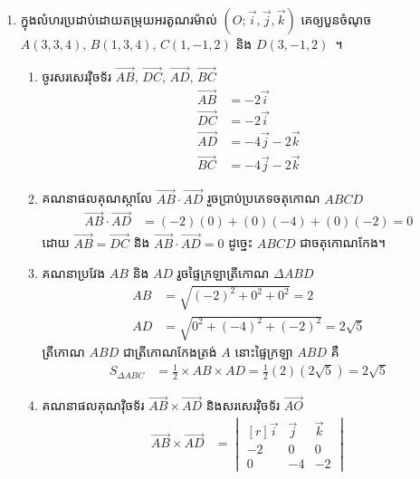 \documentclass[11pt,a4paper]{myclass}
\begin{document}
\begin{enumerate}
\begin{enumerate}
\begin{figure}[H]
\begin{tikzpicture}
				\end{tikzpicture}
			\end{figure}
		\end{enumerate}
		\item ក្នុងលំហរប្រដាប់ដោយតម្រុយអរតូណរម៉ាល់ $ (O;\vec{i},\vec{j},\vec{k}) $ គេឲ្យបួនចំណុច $ A(3,3,4),\,B(1,3,4),\,C(1,-1,2) $ និង $ D(3,-1,2) $~។%
		\begin{enumerate}
			\item ចូរសរសេរវ៉ិចទ័រ $ \overrightarrow{AB},\,\overrightarrow{DC},\,\overrightarrow{AD},\,\overrightarrow{BC} $
			\begin{align*}
			\overrightarrow{AB} &=-2\vec{i}\\
			\overrightarrow{DC} &=-2\vec{i}\\
			\overrightarrow{AD} &=-4\vec{j}-2\vec{k}\\
			\overrightarrow{BC} &=-4\vec{j}-2\vec{k}
			\end{align*}
			\item គណនាផលគុណស្កាលែ $ \overrightarrow{AB}\cdot\overrightarrow{AD} $ រួចប្រាប់ប្រភេទចតុកោណ $ ABCD $
			\begin{align*}
			\overrightarrow{AB}\cdot\overrightarrow{AD}
			&=(-2)(0)+(0)(-4)+(0)(-2)=0
			\end{align*}
			ដោយ $ \overrightarrow{AB}=\overrightarrow{DC} $ និង $ \overrightarrow{AB}\cdot\overrightarrow{AD}=0 $ ដូច្នេះ $ ABCD $ ជាចតុកោណកែង។
			\item គណនាប្រវែង $ AB $ និង $ AD $ រួចផ្ទៃក្រឡាត្រីកោណ $ \Delta ABD $
			\begin{align*}
			AB &=\sqrt{(-2)^2+0^2+0^2}=2\\
			AD &=\sqrt{0^2+(-4)^2+(-2)^2}=2\sqrt{5}
			\end{align*}
			ត្រីកោណ $ ABD $ ជាត្រីកោណកែងត្រង់ $ A $ នោះផ្ទៃក្រឡា $ ABD $ គឺ
			\begin{align*}
			S_{\Delta ABC} &=\frac{1}{2}\times AB\times AD=\frac{1}{2}(2)(2\sqrt{5})=2\sqrt{5}
			\end{align*}
			\item គណនាផលគុណវ៉ិចទ័រ $ \overrightarrow{AB}\times \overrightarrow{AD} $ និងសរសេរវ៉ិចទ័រ $ \overrightarrow{AO} $
			\begin{align*}
			\overrightarrow{AB}\times \overrightarrow{AD}
			&=\begin{vmatrix*}[r]
			\vec{i} & \vec{j} & \vec{k}\\
			-2 & 0 & 0\\
			0 & -4 & -2

\end{vmatrix*}
\end{align*}
\end{enumerate}
\end{enumerate}
\end{document}
